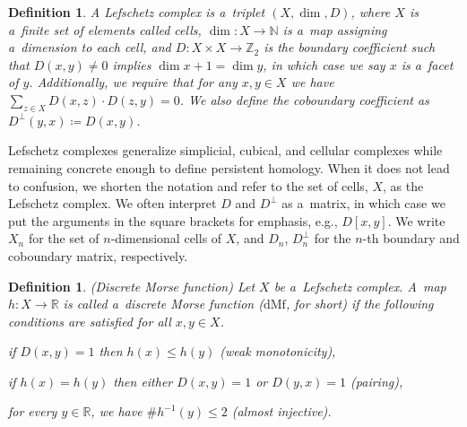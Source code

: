 \documentclass[a4paper,12pt, USenglish,cleveref,autoref,thm-restate]{article}
\newtheorem{definition}[theorem]{Definition}
\newcommand\bartek[1]{\textcolor{violet}{[BF: #1]}}
\newcommand{\mf}{h}
\newcommand{\dmf}{\text{dMf}}
\newcommand{\mB}{D}
\newcommand{\hmB}{D}
\newcommand{\cmB}{D^{\perp}}
\newcommand{\cx}{x}
\newcommand{\cy}{y}
\newcommand{\cz}{z}
\newcommand{\RR}{\mathbb{R}}
\def\card#1{\##1}
\begin{document}
\begin{definition}\label{def:lefschetz-complex}
    A \emph{Lefschetz complex} is a~triplet $(X,\dim,\mB)$, where $X$ is a~finite set of elements called cells, 
        $\dim: X\rightarrow\mathbb{N}$ 
        is a~map assigning a~dimension to each cell, 
    and $\mB:X\times X\rightarrow \mathbb{Z}_2$ is the boundary coefficient 
    such that
    $\mB(\cx,\cy)\neq 0$ implies $\dim \cx+1=\dim \cy$, 
        in which case we say $\cx$ is a~\emph{facet} of $\cy$.
    Additionally, we require that for any $\cx,\cy\in X$ we have
    $\sum_{z\in X} \mB(\cx,\cz)\cdot\mB(\cz,\cy) = 0$.
    We also define the coboundary coefficient as $\cmB(y,x)\coloneqq\hmB(x,y)$.
    


    

\end{definition}

 \noindent Lefschetz complexes generalize simplicial, cubical, and cellular complexes while remaining concrete enough to define persistent homology.
When it does not lead to confusion, we shorten the notation and refer to the set of cells, $X$, as the Lefschetz complex.
We often interpret $\mB$ and $\cmB$ as a~matrix, in which case we put the arguments in the square brackets for emphasis, e.g., $\mB[x, y]$.
We write $X_{n}$ for the set of $n$-dimensional cells of $X$, and $\hmB_n$, $\cmB_n$ for the $n$-th boundary and coboundary matrix, respectively.



\begin{definition}\label{def:dmf}(Discrete Morse function)
    Let $X$ be a~Lefschetz complex.
    A~map $\mf:X\rightarrow\RR$ is called 
    a~\emph{discrete Morse function} ($\dmf$, for short) if the following conditions are satisfied for all $\cx,\cy\in X$.
    \begin{romanenumerate}
        \item if $\hmB(\cx,\cy)=1$ then $\mf(\cx)\leq \mf(\cy)$ (weak monotonicity),
        \item if $\mf(\cx)=\mf(\cy)$ then either $\hmB(\cx,\cy)=1$ or $\hmB(\cy,\cx)=1$ (pairing),
        \item\label{it:dmf_injection} for every $\cy\in\RR$, we have $\card{\mf^{-1}(\cy)}\leq 2$ (almost injective).  
    \end{romanenumerate}
\end{definition}
\end{document}
